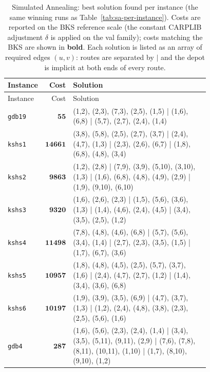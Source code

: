 \begin{landscape}
\begingroup\scriptsize
\begin{longtable}{lr>{\tiny\raggedright\arraybackslash}p{0.78\linewidth}}
\caption{Simulated Annealing: best solution found per instance (the same winning runs as Table~\ref{tab:sa-per-instance}). Costs are reported on the BKS reference scale (the constant CARPLIB adjustment $\delta$ is applied on the val family); costs matching the BKS are shown in \textbf{bold}. Each solution is listed as an array of required edges $(u,v)$: routes are separated by $|$ and the depot is implicit at both ends of every route.}\label{tab:sa-solutions}\\
\toprule
Instance & Cost & Solution \\
\midrule
\endfirsthead
\toprule
Instance & Cost & Solution \\
\midrule
\endhead
\bottomrule
\endfoot
\texttt{gdb19} & $\mathbf{55}$ & (1,2), (2,3), (7,3), (2,5), (1,5) | (1,6), (6,8) | (5,7), (2,7), (2,4), (1,4) \\[2pt]
\texttt{kshs1} & $\mathbf{14661}$ & (3,8), (5,8), (2,5), (2,7), (3,7) | (2,4), (4,7), (1,3) | (2,3), (2,6), (6,7) | (1,8), (6,8), (4,8), (3,4) \\[2pt]
\texttt{kshs2} & $\mathbf{9863}$ & (1,2), (2,8) | (7,9), (3,9), (5,10), (3,10), (1,3) | (1,6), (6,8), (4,8), (4,9), (2,9) | (1,9), (9,10), (6,10) \\[2pt]
\texttt{kshs3} & $\mathbf{9320}$ & (1,6), (2,6), (2,3) | (1,5), (5,6), (3,6), (1,3) | (1,4), (4,6), (2,4), (4,5) | (3,4), (3,5), (2,5), (1,2) \\[2pt]
\texttt{kshs4} & $\mathbf{11498}$ & (7,8), (4,8), (4,6), (6,8) | (5,7), (5,6), (3,4), (1,4) | (2,7), (2,3), (3,5), (1,5) | (1,7), (6,7), (3,6) \\[2pt]
\texttt{kshs5} & $\mathbf{10957}$ & (1,8), (4,8), (4,5), (2,5), (5,7), (3,7), (1,6) | (2,4), (4,7), (2,7), (1,2) | (1,4), (3,4), (3,6), (6,8) \\[2pt]
\texttt{kshs6} & $\mathbf{10197}$ & (1,9), (3,9), (3,5), (6,9) | (4,7), (3,7), (1,3) | (1,2), (2,4), (4,8), (3,8), (2,3), (2,5), (5,6), (1,6) \\[2pt]
\texttt{gdb4} & $\mathbf{287}$ & (1,6), (5,6), (2,3), (2,4), (1,4) | (3,4), (3,5), (5,11), (9,11), (2,9) | (7,6), (7,8), (8,11), (10,11), (1,10) | (1,7), (8,10), (9,10), (1,2) \\[2pt]

\end{longtable}
\end{landscape}
